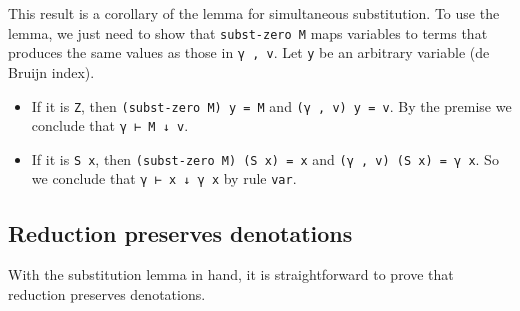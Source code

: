 This result is a corollary of the lemma for simultaneous substitution.
To use the lemma, we just need to show that \texttt{subst-zero\ M} maps
variables to terms that produces the same values as those in
\texttt{γ\ ,\ v}. Let \texttt{y} be an arbitrary variable (de Bruijn
index).

\begin{itemize}
\item
  If it is \texttt{Z}, then \texttt{(subst-zero\ M)\ y\ =\ M} and
  \texttt{(γ\ ,\ v)\ y\ =\ v}. By the premise we conclude that
  \texttt{γ\ ⊢\ M\ ↓\ v}.
\item
  If it is \texttt{S\ x}, then \texttt{(subst-zero\ M)\ (S\ x)\ =\ x}
  and \texttt{(γ\ ,\ v)\ (S\ x)\ =\ γ\ x}. So we conclude that
  \texttt{γ\ ⊢\ x\ ↓\ γ\ x} by rule \texttt{var}.
\end{itemize}

\hypertarget{reduction-preserves-denotations}{%
\subsection{Reduction preserves
denotations}\label{reduction-preserves-denotations}}

With the substitution lemma in hand, it is straightforward to prove that
reduction preserves denotations.

